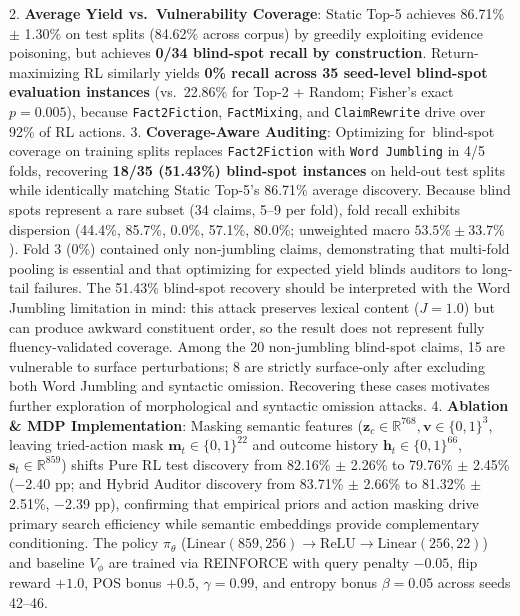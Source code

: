 \documentclass[11pt]{article}
\begin{document}
2. \textbf{Average Yield vs.\ Vulnerability Coverage}: Static Top-5 achieves 86.71\% $\pm$ 1.30\% on test splits (84.62\% across corpus) by greedily exploiting evidence poisoning, but achieves \textbf{0/34 blind-spot recall by construction}. Return-maximizing RL similarly yields \textbf{0\% recall across 35 seed-level blind-spot evaluation instances} (vs.\ 22.86\% for Top-2 + Random; Fisher's exact $p = 0.005$), because \texttt{Fact2Fiction}, \texttt{FactMixing}, and \texttt{ClaimRewrite} drive over 92\% of RL actions.
3. \textbf{Coverage-Aware Auditing}: Optimizing for~blind-spot coverage on training splits replaces \texttt{Fact2Fiction} with \texttt{Word Jumbling} in 4/5 folds, recovering \textbf{18/35 (51.43\%) blind-spot instances} on held-out test splits while identically matching Static Top-5's 86.71\% average discovery. Because blind spots represent a rare subset (34 claims, 5--9 per fold), fold recall exhibits dispersion (44.4\%, 85.7\%, 0.0\%, 57.1\%, 80.0\%; unweighted macro $53.5\% \pm 33.7\%$). Fold 3 (0\%) contained only non-jumbling claims, demonstrating that multi-fold pooling is essential and that optimizing for expected yield blinds auditors to long-tail failures. The 51.43\% blind-spot recovery should be interpreted with the Word Jumbling limitation in mind: this attack preserves lexical content ($J=1.0$) but can produce awkward constituent order, so the result does not represent fully fluency-validated coverage. Among the 20 non-jumbling blind-spot claims, 15 are vulnerable to surface perturbations; 8 are strictly surface-only after excluding both Word Jumbling and syntactic omission. Recovering these cases motivates further exploration of morphological and syntactic omission attacks.
4. \textbf{Ablation \& MDP Implementation}: Masking semantic features ($\mathbf{z}_c \in \mathbb{R}^{768}, \mathbf{v} \in \{0, 1\}^3$, leaving tried-action mask $\mathbf{m}_t \in \{0, 1\}^{22}$ and outcome history $\mathbf{h}_t \in \{0, 1\}^{66}$, $\mathbf{s}_t \in \mathbb{R}^{859}$) shifts Pure RL test discovery from 82.16\% $\pm$ 2.26\% to 79.76\% $\pm$ 2.45\% ($-$2.40 pp; and Hybrid Auditor discovery from 83.71\% $\pm$ 2.66\% to 81.32\% $\pm$ 2.51\%, $-$2.39 pp), confirming that empirical priors and action masking drive primary search efficiency while semantic embeddings provide complementary conditioning. The policy $\pi_\theta$ ($\text{Linear}(859, 256) \to \text{ReLU} \to \text{Linear}(256, 22)$) and baseline $V_\phi$ are trained via REINFORCE with query penalty $-0.05$, flip reward $+1.0$, POS bonus $+0.5$, $\gamma=0.99$, and entropy bonus $\beta=0.05$ across seeds 42--46.
\end{document}
